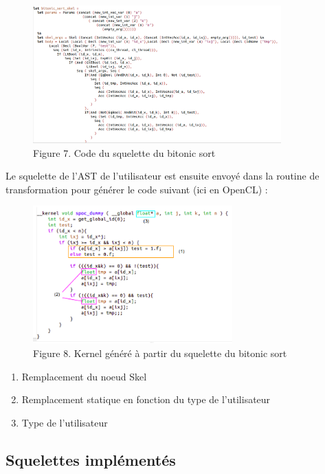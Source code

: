 \documentclass{report}
\begin{document}
\begin{figure}[!h]
\begin{center}
\includegraphics[height=150pt]{images_finales/skel_sort.png}
\end{center}
\caption{Figure 7. Code du squelette du bitonic sort}
\label{test7}
\end{figure}

\newpage
Le squelette de l'AST de l'utilisateur est ensuite envoyé dans la routine de transformation pour générer le code suivant (ici en OpenCL) : \newline

\begin{figure}[!h]
\begin{center}
\includegraphics[height=150pt]{images_finales/kernel_sort.png}
\end{center}
\caption{Figure 8. Kernel généré à partir du squelette du bitonic sort}
\label{test8}
\end{figure}


\begin{enumerate}
\item Remplacement du noeud Skel
\item Remplacement statique en fonction du type de l'utilisateur
\item Type de l'utilisateur
\end{enumerate}
\newpage
\subsection{Squelettes implémentés}
\end{document}
